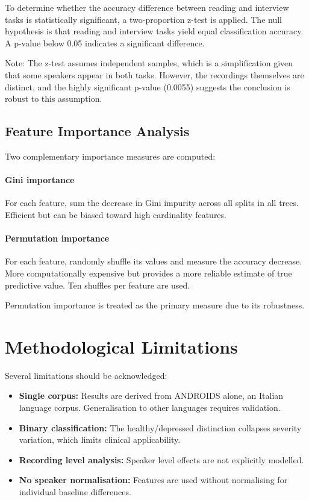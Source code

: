 To determine whether the accuracy difference between reading and interview tasks is statistically significant, a two-proportion z-test is applied. The null hypothesis is that reading and interview tasks yield equal classification accuracy. A p-value below 0.05 indicates a significant difference.

Note: The z-test assumes independent samples, which is a simplification given that some speakers appear in both tasks. However, the recordings themselves are distinct, and the highly significant p-value (0.0055) suggests the conclusion is robust to this assumption.

\subsection{Feature Importance Analysis}

Two complementary importance measures are computed:

\paragraph{Gini importance} For each feature, sum the decrease in Gini impurity across all splits in all trees. Efficient but can be biased toward high cardinality features.

\paragraph{Permutation importance} For each feature, randomly shuffle its values and measure the accuracy decrease. More computationally expensive but provides a more reliable estimate of true predictive value. Ten shuffles per feature are used.

Permutation importance is treated as the primary measure due to its robustness.

\section{Methodological Limitations}

Several limitations should be acknowledged:

\begin{itemize}
    \item \textbf{Single corpus:} Results are derived from ANDROIDS alone, an Italian language corpus. Generalisation to other languages requires validation.
    \item \textbf{Binary classification:} The healthy/depressed distinction collapses severity variation, which limits clinical applicability.
    \item \textbf{Recording level analysis:} Speaker level effects are not explicitly modelled.
    \item \textbf{No speaker normalisation:} Features are used without normalising for individual baseline differences.
\end{itemize}


